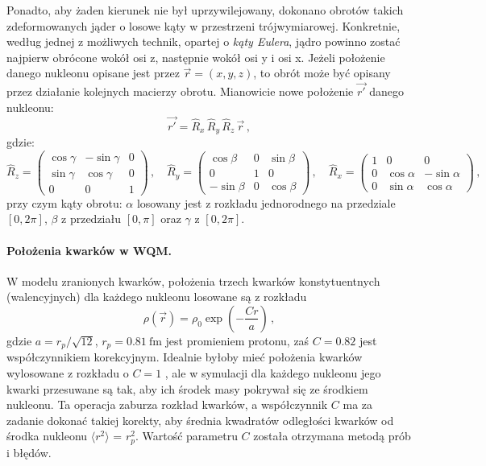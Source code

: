 \documentclass[a4paper,12pt]{article}
\begin{document}
Ponadto, aby żaden kierunek nie był uprzywilejowany, dokonano obrotów takich zdeformowanych jąder o losowe kąty w przestrzeni trójwymiarowej. Konkretnie, według jednej z możliwych technik, opartej o \textit{kąty Eulera}, jądro powinno zostać najpierw obrócone wokół osi z, następnie wokół osi y i osi x. Jeżeli położenie danego nukleonu opisane jest przez $\vec{r} = (x, y, z)$, to obrót może być opisany przez działanie kolejnych macierzy obrotu. Mianowicie nowe położenie $\vec{r'}$ danego nukleonu:
\begin{equation}
\vec{r'} = \widehat{R}_x\, \widehat{R}_y\, \widehat{R}_z\, \vec{r}\,,
\end{equation}
gdzie:
\begin{equation}
\widehat{R}_z = \left( \begin{array}{ccc}
			\cos\gamma & -\sin\gamma & 0 \\
			\sin\gamma & \cos \gamma & 0 \\
			0 & 0 & 1
		\end{array} \right) \,, \quad
\widehat{R}_y = \left(\begin{array}{ccc}
			\cos\beta & 0 & \sin\beta   \\
			0 & 1 & 0 \\
			-\sin\beta & 0 & \cos \beta 
		\end{array} \right) \,, \quad
\widehat{R}_x = \left(\begin{array}{ccc}
			1 & 0 & 0 \\
			0 & \cos\alpha & -\sin\alpha   \\
			0 & \sin\alpha & \cos \alpha 
		\end{array} \right)\,,
\end{equation}
przy czym kąty obrotu: $\alpha$ losowany jest z rozkładu jednorodnego na przedziale $[0, 2\pi]$, $\beta$ z przedziału $[0, \pi]$ oraz $\gamma$ z $[0, 2\pi]$.

\paragraph{Położenia kwarków w WQM.}
W modelu zranionych kwarków, położenia trzech kwarków konstytuentnych (walencyjnych) dla każdego nukleonu losowane są z rozkładu
\begin{equation}\label{eq:eq-quark-distr}
\rho(\vec{r})=\rho_0\exp\left(-\frac{Cr}{a}\right)\,,
\end{equation}
gdzie $a={r_p}/{\sqrt{12}}$, $r_p=0.81~\mathrm{fm}$ jest promieniem protonu, zaś $C=0.82$ jest współczynnikiem korekcyjnym. Idealnie byłoby mieć położenia kwarków wylosowane z rozkładu o $C=1$ \cite{Adler:2013aqf,Hofstadter:1956qs}, ale w symulacji dla każdego nukleonu jego kwarki przesuwane są tak, aby ich środek masy pokrywał się ze środkiem nukleonu. Ta operacja zaburza rozkład kwarków, a współczynnik $C$ ma za zadanie dokonać takiej korekty, aby średnia kwadratów odległości kwarków od środka nukleonu $\langle r^2 \rangle$  = $r_p^2$. Wartość parametru $C$ została otrzymana metodą prób i błędów. 
\end{document}
